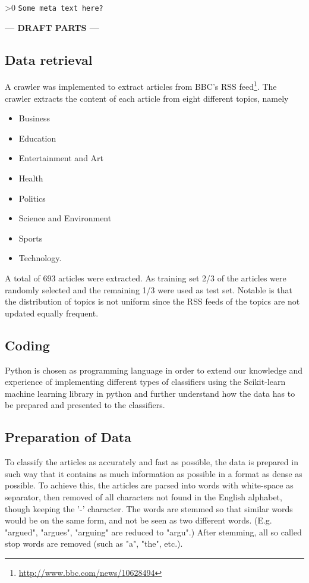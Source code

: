 \ifnum\printdraft>0
	\texttt{Some meta text here?}
\else
\begin{center}
	\textbf{--- DRAFT PARTS ---}
\end{center}
\fi
\subsection{Data retrieval}
A crawler was implemented to extract articles from BBC's RSS feed\footnote{\url{http://www.bbc.com/news/10628494}}. The crawler extracts the content of each article from eight different topics, namely
\begin{itemize}[noitemsep,nolistsep]
	\item Business
	\item Education
	\item Entertainment and Art
	\item Health
	\item Politics
	\item Science and Environment
	\item Sports
	\item Technology.
\end{itemize}
A total of 693 articles were extracted. As training set 2/3 of the articles were randomly selected and the remaining 1/3 were used as test set. Notable is that the distribution of topics is not uniform since the RSS feeds of the topics are not updated equally frequent. 
\subsection{Coding}
Python is chosen as programming language in order to extend our knowledge and experience of implementing different types of classifiers using the Scikit-learn machine learning library in python and further understand how the data has to be prepared and presented to the classifiers.
\subsection{Preparation of Data}
To classify the articles as accurately and fast as possible, the data is prepared in such way that it contains as much information as possible in a format as dense as possible. To achieve this, the articles are parsed into words with white-space as separator, then removed of all characters not found in the English alphabet, though keeping the '-' character. The words are stemmed so that similar words would be on the same form, and not be seen as two different words. (E.g. "argued", "argues", "arguing" are reduced to "argu".) After stemming, all so called stop words are removed (such as "a", "the", etc.). 
